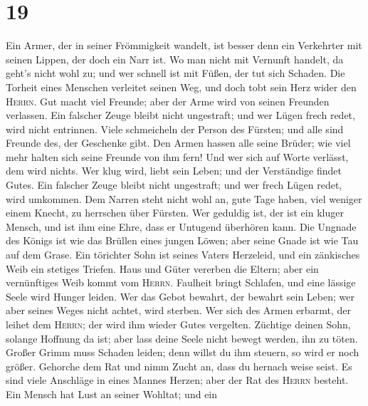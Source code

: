 \hypertarget{section-18}{%
\section{19}\label{section-18}}

 Ein Armer, der in seiner Frömmigkeit wandelt, ist besser
denn ein Verkehrter mit seinen Lippen, der doch ein Narr ist.
 Wo man nicht mit Vernunft handelt, da geht's nicht wohl
zu; und wer schnell ist mit Füßen, der tut sich Schaden. 
Die Torheit eines Menschen verleitet seinen Weg, und doch tobt sein Herz
wider den \textsc{Herrn}.  Gut macht viel Freunde; aber
der Arme wird von seinen Freunden verlassen.  Ein falscher
Zeuge bleibt nicht ungestraft; und wer Lügen frech redet, wird nicht
entrinnen.  Viele schmeicheln der Person des Fürsten; und
alle sind Freunde des, der Geschenke gibt.  Den Armen
hassen alle seine Brüder; wie viel mehr halten sich seine Freunde von
ihm fern! Und wer sich auf Worte verlässt, dem wird nichts.
 Wer klug wird, liebt sein Leben; und der Verständige
findet Gutes.  Ein falscher Zeuge bleibt nicht ungestraft;
und wer frech Lügen redet, wird umkommen.  Dem Narren
steht nicht wohl an, gute Tage haben, viel weniger einem Knecht, zu
herrschen über Fürsten.  Wer geduldig ist, der ist ein
kluger Mensch, und ist ihm eine Ehre, dass er Untugend überhören kann.
 Die Ungnade des Königs ist wie das Brüllen eines jungen
Löwen; aber seine Gnade ist wie Tau auf dem Grase.  Ein
törichter Sohn ist seines Vaters Herzeleid, und ein zänkisches Weib ein
stetiges Triefen.  Haus und Güter vererben die Eltern;
aber ein vernünftiges Weib kommt vom \textsc{Herrn}. 
Faulheit bringt Schlafen, und eine lässige Seele wird Hunger leiden.
 Wer das Gebot bewahrt, der bewahrt sein Leben; wer aber
seines Weges nicht achtet, wird sterben.  Wer sich des
Armen erbarmt, der leihet dem \textsc{Herrn}; der wird ihm wieder Gutes
vergelten.  Züchtige deinen Sohn, solange Hoffnung da
ist; aber lass deine Seele nicht bewegt werden, ihn zu töten.
 Großer Grimm muss Schaden leiden; denn willst du ihm
steuern, so wird er noch größer.  Gehorche dem Rat und
nimm Zucht an, dass du hernach weise seist.  Es sind
viele Anschläge in eines Mannes Herzen; aber der Rat des \textsc{Herrn}
besteht.  Ein Mensch hat Lust an seiner Wohltat; und ein
